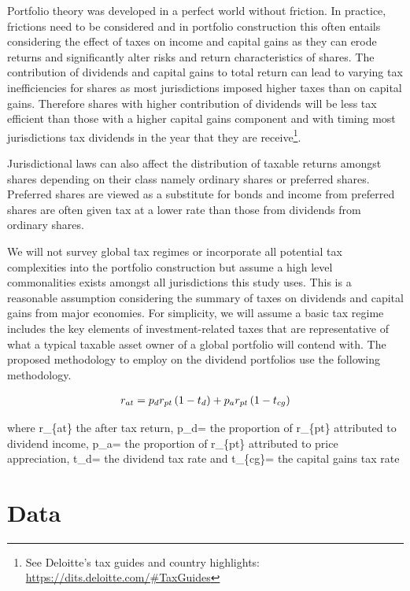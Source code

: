 \documentclass[12pt,preprint, authoryear]{elsarticle}
\numberwithin{equation}{section}
\numberwithin{figure}{section}
\numberwithin{table}{section}
\let\rmarkdownfootnote\footnote%
\def\footnote{\protect\rmarkdownfootnote}
\begin{document}
Portfolio theory was developed in a perfect world without friction. In
practice, frictions need to be considered and in portfolio construction
this often entails considering the effect of taxes on income and capital
gains as they can erode returns and significantly alter risks and return
characteristics of shares. The contribution of dividends and capital
gains to total return can lead to varying tax inefficiencies for shares
as most jurisdictions imposed higher taxes than on capital gains.
Therefore shares with higher contribution of dividends will be less tax
efficient than those with a higher capital gains component and with
timing most jurisdictions tax dividends in the year that they are
receive\footnote{See Deloitte's tax guides and country highlights:
  \url{https://dits.deloitte.com/\#TaxGuides}}.

Jurisdictional laws can also affect the distribution of taxable returns
amongst shares depending on their class namely ordinary shares or
preferred shares. Preferred shares are viewed as a substitute for bonds
and income from preferred shares are often given tax at a lower rate
than those from dividends from ordinary shares.

We will not survey global tax regimes or incorporate all potential tax
complexities into the portfolio construction but assume a high level
commonalities exists amongst all jurisdictions this study uses. This is
a reasonable assumption considering the summary of taxes on dividends
and capital gains from major economies. For simplicity, we will assume a
basic tax regime includes the key elements of investment-related taxes
that are representative of what a typical taxable asset owner of a
global portfolio will contend with. The proposed methodology to employ
on the dividend portfolios use the following methodology.

\begin{align}
r_{a t}=p_d r_{p t}\left(1-t_d\right)+p_a r_{p t}\left(1-t_{c g}\right) \notag
\end{align}

where r\_\{at\} the after tax return, p\_d= the proportion of r\_\{pt\}
attributed to dividend income, p\_a= the proportion of r\_\{pt\}
attributed to price appreciation, t\_d= the dividend tax rate and
t\_\{cg\}= the capital gains tax rate

\newpage

\hypertarget{data}{%
\section{Data}\label{data}}
\end{document}
